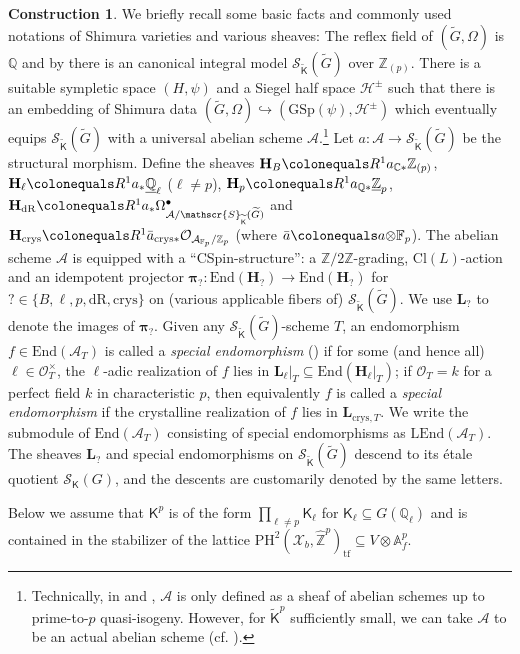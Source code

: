 \documentclass[11pt, letterpaper]{amsart}
\theoremstyle{plain}
\theoremstyle{definition}
\newtheorem{construction}[theorem]{Construction}
\newcommand{\IA}{\mathbb{A}}
\newcommand{\IC}{\mathbb{C}}
\newcommand{\IF}{\mathbb{F}}
\newcommand{\IQ}{\mathbb{Q}}
\newcommand{\IZ}{\mathbb{Z}}
\newcommand{\End}{\mathrm{End}}
\newcommand\tensor{{\otimes}}
\newcommand{\<}{\langle}
\renewcommand{\>}{\rangle}
\newcommand{\into}{\hookrightarrow}
\def\wt{\widetilde}
\def\what{\widehat}
\newcommand{\sH}{\mathcal{H}}
\newcommand{\Ohm}{\Omega}
\newcommand{\sO}{\mathcal{O}}
\newcommand{\Cl}{\mathrm{Cl}}
\newcommand{\shS}{\mathscr{S}}
\newcommand{\sA}{\mathcal{A}}
\newcommand{\sX}{\mathcal{X}}
\newcommand{\bL}{\mathbf{L}}
\newcommand{\LEnd}{\mathrm{LEnd}}
\newcommand{\PH}{\mathrm{PH}}
\newcommand{\crys}{\mathrm{crys}}
\newcommand{\sfK}{\mathsf{K}}
\newcommand{\bH}{\mathbf{H}}
\newcommand{\dR}{\mathrm{dR}}
\newcommand{\bpi}{\boldsymbol{\pi}}
\newcommand{\GSp}{\mathrm{GSp}}
\begin{document}
\begin{construction}
We briefly recall some basic facts and commonly used notations of Shimura varieties and various sheaves: 
The reflex field of $(\wt{G}, \Ohm)$ is $\IQ$ and by \cite{KisinInt} there is an canonical integral model $\shS_{\wt{\sfK}}(\wt{G})$ over $\IZ_{(p)}$. 
There is a suitable sympletic space $(H, \psi)$ and a Siegel half space $\sH^\pm$ such that there is an embedding of Shimura data $(\wt{G}, \Ohm) \into (\GSp(\psi), \sH^\pm)$ which eventually equips $\shS_{\wt{\sfK}}(\wt{G})$ with a universal abelian scheme $\sA$.\footnote{Technically, in \cite{KisinInt} and \cite{CSpin}, $\sA$ is only defined as a sheaf of abelian schemes up to prime-to-$p$ quasi-isogeny. 
However, for $\wt{\sfK}^p$ sufficiently small, we can take $\sA$ to be an actual abelian scheme (cf. \cite[(2.1.5)]{KisinInt}).} 
Let $a : \sA \to \shS_{\wt{\sfK}}(\wt{G})$ be the structural morphism. 
Define the sheaves $\bH_B \colonequals R^1 a_{\IC *} \IZ_{(p)}$, $\bH_\ell \colonequals R^1 a_* \underline{\IQ}_\ell$ ($\ell \neq p$), $\bH_p \colonequals R^1 a_{\IQ *} \underline{\IZ}_p$, $\textbf{H}_\dR \colonequals R^1 a_* \Ohm^\bullet_{\sA / \shS_{\wt{\sfK}}(\wt{G})}$ and $\bH_\crys \colonequals R^1 \bar{a}_{\crys *} \sO_{\sA_{\IF_p}/ \IZ_p}$ (where $\bar{a} \colonequals a \tensor \IF_p$). 
The abelian scheme $\sA$ is equipped with a ``CSpin-structure'': a $\IZ / 2 \IZ$-grading, $\Cl(L)$-action and an idempotent projector $\bpi_? : \End(\bH_?) \to \End(\bH_?)$ for $?\in \{B, \ell, p, \dR, \crys\}$ on (various applicable fibers of) $\shS_{\wt{\sfK}}(\wt{G})$. 
We use $\bL_?$ to denote the images of $\bpi_?$. 
Given any $\shS_{\wt{\sfK}}(\wt{G})$-scheme $T$, an endomorphism $f \in \End(\sA_T)$ is called a \textit{special endomorphism} (\cite[Def.~5.2, see also Lem.~5.4, Cor.~5.22]{CSpin}) if for some (and hence all) $\ell \in \sO_T^\times$, the $\ell$-adic realization of $f$ lies in $\bL_\ell|_T \subseteq \End(\bH_\ell|_T)$; if $\sO_T = k$ for a perfect field $k$ in characteristic $p$, then equivalently $f$ is called a \textit{special endomorphism} if the crystalline realization of $f$ lies in $\bL_{\crys, T}$. We write the submodule of $\End(\sA_T)$ consisting of special endomorphisms as $\LEnd(\sA_T)$. 
The sheaves $\bL_?$ and special endomorphisms on $\shS_{\wt{\sfK}}(\wt{G})$ descend to its \'etale quotient $\shS_{\sfK}(G)$, and the descents are customarily denoted by the same letters. 
\end{construction}



Below we assume that $\sfK^p$ is of the form $\prod_{\ell \neq p} \sfK_\ell$ for $\sfK_\ell \subseteq G(\IQ_\ell)$ and is contained in the stabilizer of the lattice $\PH^2(\sX_b, \what{\IZ}^p)_{\mathrm{tf}} \subseteq V \tensor \IA^p_f$. 
\end{document}
